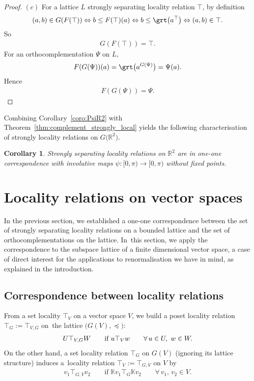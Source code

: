 \documentclass[pdftex]{sigma}
\numberwithin{equation}{section}
\newtheorem{Corollary}[Theorem]{Corollary}
\newcommand{\R}{\mathbb{R}}
\newcommand{\K}{\mathbb{K}}
\newcommand{\loc}{locality\xspace}
\newcommand{\pone}{separating\xspace }
\begin{document}
\begin{proof}
$(c)$ For a lattice $L$ strongly \pone \loc relation $\top $, by definition
\begin{gather*}
(a,b)\in G(F(\top))\Leftrightarrow b\le F(\top)(a)\Leftrightarrow b \le \grt \big(a^\top\big)\Leftrightarrow (a,b)\in \top.
 \end{gather*}
So
\begin{gather*}
G(F(\top))=\top.
\end{gather*}
For an orthocomplementation $\Psi $ on $L$,
\begin{gather*}
F(G(\Psi ))(a)=\grt \big(a^{G(\Psi)}\big)=\Psi (a).
\end{gather*}
Hence
\begin{gather*}
F(G(\Psi))=\Psi.\tag*{\qed}
\end{gather*}
\renewcommand{\qed}{}
\end{proof}

Combining Corollary~\ref{coro:PsiR2} with Theorem~\ref{thm:complement_strongly_local} yields the following characterisation of strongly locality relations on $G\big(\R^2\big)$.
	\begin{Corollary}\label{cor:topGR2} Strongly separating locality relations on $\R^2$ are in one-one correspondence with involutive maps $\psi\colon [0, \pi)\to [0, \pi)$ without fixed points.
		\end{Corollary}
	
\section{Locality relations on vector spaces}\label{sect:locvectspaces}
In the previous section, we established a one-one correspondence between the set of
strongly \pone \loc relations on a bounded lattice and the set of orthocomplementations on the lattice. In~this section, we apply the correspondence to the subspace lattice of a finite dimensional vector space, a case of direct interest for the applications to renormalisation we have in mind, as explained in the introduction.

\subsection{Correspondence between locality relations}

From a set locality $\top _V$ on a vector space $V$, we build a poset locality relation $\top _G:=\top_{V,G}$ on~the lattice $\big(G(V), \preceq\big)$:
\begin{gather}
\label{eq:locVtoGV}
U\top _{V,G} W\qquad \text{\rm if } u\top _V w \qquad \forall\, u\in U,\ w\in W.
\end{gather}
	On the other hand,
	a set locality relation $\top_G$ on $G(V)$ (ignoring its lattice structure) induces a~locality relation $\top _V:=\top _{G,V}$ on $V$ by
\begin{gather} \label{eq:locGVtoV}
v_1\top_{G,V} v_2\qquad \text{if } \K v_1 \top _G \K v_2 \qquad\forall\, v_1,\, v_2\in V.
\end{gather} 	
\end{document}
